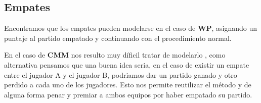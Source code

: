 \subsection{Empates}

Encontramos que los empates pueden modelarse en el caso de \textbf{WP}, asignando un puntaje al partido empatado y continuando con el procedimiento normal.

En el caso de \textbf{CMM} nos resulto muy díficil tratar de modelarlo , como alternativa pensamos que una buena idea seria, en el caso de existir un empate entre el 
jugador A y el jugador B, podriamos dar un partido ganado y otro perdido a cada uno de los jugadores. 
Esto nos permite reutilizar el método y de alguna forma penar y premiar a ambos equipos por haber empatado su partido.
















